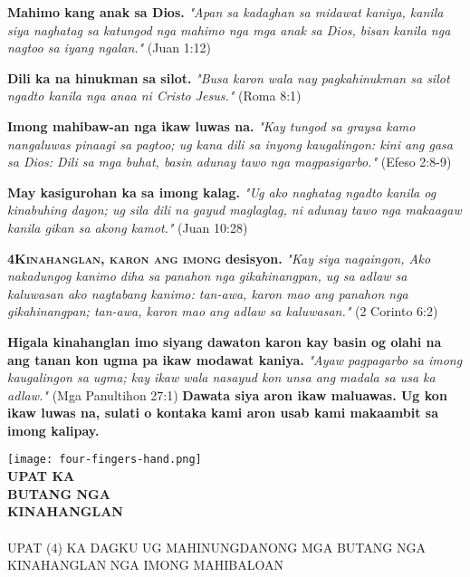 \documentclass[9pt]{article}
\def\nin{\noindent}
\begin{document}
\begin{multicols*}{2}
	\nin\textbf{Mahimo kang anak sa Dios.} \textit{"Apan sa kadaghan sa midawat kaniya, kanila siya naghatag sa katungod nga mahimo nga mga anak sa Dios, bisan kanila nga nagtoo sa iyang ngalan."} (Juan 1:12)
	
	\nin\textbf{Dili ka na hinukman sa silot.} \textit{"Busa karon wala nay pagkahinukman sa silot ngadto kanila nga anaa ni Cristo Jesus."} (Roma 8:1)
	
	\nin\textbf{Imong mahibaw-an nga ikaw luwas na.} \textit{"Kay tungod sa graysa kamo nangaluwas pinaagi sa pagtoo; ug kana dili sa inyong kaugalingon: kini ang gasa sa Dios: Dili sa mga buhat, basin adunay tawo nga magpasigarbo."} (Efeso 2:8-9)
	
	\nin\textbf{May kasigurohan ka sa imong kalag.} \textit{"Ug ako naghatag ngadto kanila og kinabuhing dayon; ug sila dili na gayud maglaglag, ni adunay tawo nga makaagaw kanila gikan sa akong kamot."} (Juan 10:28)
	
	\lettrine[lines=3]{\textbf{4}}{\textbf{Kinahanglan, karon ang imong}} \textbf{desisyon.} \textit{"Kay siya nagaingon, Ako nakadungog kanimo diha sa panahon nga gikahinangpan, ug sa adlaw sa kaluwasan ako nagtabang kanimo: tan-awa, karon mao ang panahon nga gikahinangpan; tan-awa, karon mao ang adlaw sa kaluwasan."} (2 Corinto 6:2)
	
	\nin\textbf{Higala kinahanglan imo siyang dawaton karon kay basin og olahi na ang tanan kon ugma pa ikaw modawat kaniya.} \textit{"Ayaw pagpagarbo sa imong kaugalingon sa ugma; kay ikaw wala nasayud kon unsa ang madala sa usa ka adlaw."} (Mga Panultihon 27:1) \textbf{Dawata siya aron ikaw maluawas. Ug kon ikaw luwas na, sulati o kontaka kami aron usab kami makaambit sa imong kalipay.}
	\vfill\null
	\columnbreak
	\null
	\begin{minipage}[c]{0.9\linewidth}
		\BgThispage 
	\begin{center}
		\texttt{[image: four-fingers-hand.png]}\\
		{\bfseries
			\fontsize{21pt}{21pt}\selectfont
			UPAT KA \\
			BUTANG NGA \\
			KINAHANGLAN \\ \phantom{blindtext}}\\[12pt]
		\fontsize{14pt}{14pt}\selectfont
		UPAT (4) KA DAGKU UG \mbox{MAHINUNGDANONG} MGA BUTANG NGA KINAHANGLAN NGA IMONG MAHIBALOAN
	\end{center}
	\end{minipage}
	\end{multicols*}
\end{document}
